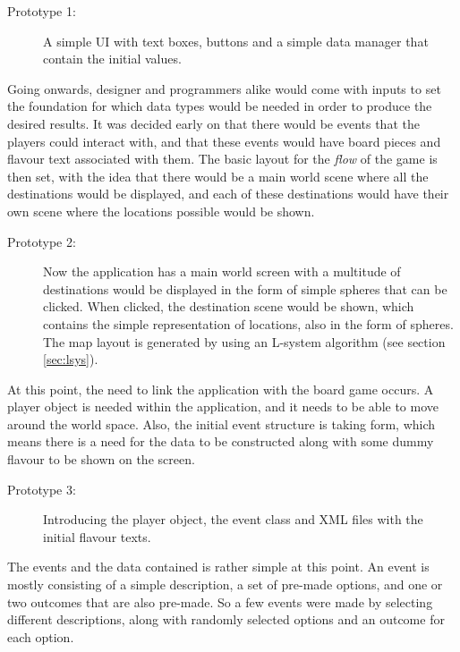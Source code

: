 \begin{description}
\item[Prototype 1:] A simple UI with text boxes, buttons and a simple data manager that contain the initial values.
\end{description}

Going onwards, designer and programmers alike would come with inputs to set the foundation for which data types would be needed in order to produce the desired results.
It was decided early on that there would be events that the players could interact with, and that these events would have board pieces and flavour text associated with them. The basic layout for the \textit{flow} of the game is then set, with the idea that there would be a main world scene where all the destinations would be displayed, and each of these destinations would have their own scene where the locations possible would be shown.

\begin{description}
\item[Prototype 2:] Now the application has a main world screen with a multitude of destinations would be displayed in the form of simple spheres that can be clicked. When clicked, the destination scene would be shown, which contains the simple representation of locations, also in the form of spheres.
The map layout is generated by using an L-system algorithm (see section \ref{sec:lsys}).
\end{description}

At this point, the need to link the application with the board game occurs. A player object is needed within the application, and it needs to be able to move around the world space. Also, the initial event structure is taking form, which means there is a need for the data to be constructed along with some dummy flavour to be shown on the screen.

\begin{description}
\item[Prototype 3:] Introducing the player object, the event class and XML files with the initial flavour texts.
\end{description}

The events and the data contained is rather simple at this point. An event is mostly consisting of a simple description, a set of pre-made options, and one or two outcomes that are also pre-made. So a few events were made by selecting different descriptions, along with randomly selected options and an outcome for each option.

